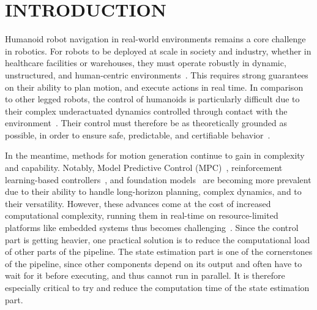 \documentclass{IJCAS}
\begin{document}


\section{INTRODUCTION}


Humanoid robot navigation in real-world environments remains a core challenge in robotics. For robots to be deployed at scale in society and industry, whether in healthcare facilities or warehouses, they must operate robustly in dynamic, unstructured, and human-centric environments~\cite{Kuindersma2015OptimizationBasedLocomAtlas}. This requires strong guarantees on their ability to plan motion, and execute actions in real time. In comparison to other legged robots, the control of humanoids is particularly difficult due to their complex underactuated dynamics controlled through contact with the environment~\cite{sugihara2020surveyDynamicsHumanoids}. Their control must therefore be as theoretically grounded as possible, in order to ensure safe, predictable, and certifiable behavior~\cite{chlipala2013CertifiedProgrammingCoq}.

In the meantime, methods for motion generation continue to gain in complexity and capability. Notably, Model Predictive Control (MPC)~\cite{Katayama2023MpcLeggedHumanoid, Dantec2022WholeBodyMPCTorqueControl, Dallard2024AdiosStabilizers}, reinforcement learning-based controllers~\cite{Peters2003ReinforcmentLearningForHumanoid, Li2025RLVersatileDynamicRobustBipedalLocom}, and foundation models~\cite{Bjorck2025GrootN1, kawaharazuka2024RealWorldApplicationsFoundationModels} are becoming more prevalent due to their ability to handle long-horizon planning, complex dynamics, and to their versatility. However, these advances come at the cost of increased computational complexity, running them in real-time on resource-limited platforms like embedded systems thus becomes challenging~\cite{Zeilinger2014RealTimeRobustMPC, findeisen2004computationalDelayNMPC, Thodoroff2022BenchmarkingRealTimeRL, Firoozi2025FoundationModelsInRobotics}. Since the control part is getting heavier, one practical solution is to reduce the computational load of other parts of the pipeline. The state estimation part is one of the cornerstones of the pipeline, since other components depend on its output and often have to wait for it before executing, and thus cannot run in parallel. It is therefore especially critical to try and reduce the computation time of the state estimation part.
\end{document}
